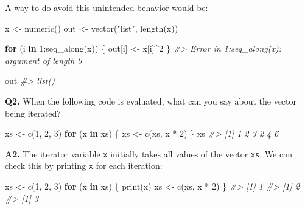 \documentclass[
]{book}
\newenvironment{Shaded}{\begin{snugshade}}{\end{snugshade}}
\newcommand{\CommentTok}[1]{\textcolor[rgb]{0.56,0.35,0.01}{\textit{#1}}}
\newcommand{\ControlFlowTok}[1]{\textcolor[rgb]{0.13,0.29,0.53}{\textbf{#1}}}
\newcommand{\DecValTok}[1]{\textcolor[rgb]{0.00,0.00,0.81}{#1}}
\newcommand{\FunctionTok}[1]{\textcolor[rgb]{0.00,0.00,0.00}{#1}}
\newcommand{\NormalTok}[1]{#1}
\newcommand{\OtherTok}[1]{\textcolor[rgb]{0.56,0.35,0.01}{#1}}
\newcommand{\SpecialCharTok}[1]{\textcolor[rgb]{0.00,0.00,0.00}{#1}}
\newcommand{\StringTok}[1]{\textcolor[rgb]{0.31,0.60,0.02}{#1}}
\begin{document}
A way to do avoid this unintended behavior would be:

\begin{Shaded}
\begin{Highlighting}[]
\NormalTok{x }\OtherTok{\textless{}{-}} \FunctionTok{numeric}\NormalTok{()}
\NormalTok{out }\OtherTok{\textless{}{-}} \FunctionTok{vector}\NormalTok{(}\StringTok{"list"}\NormalTok{, }\FunctionTok{length}\NormalTok{(x))}

\ControlFlowTok{for}\NormalTok{ (i }\ControlFlowTok{in} \DecValTok{1}\SpecialCharTok{:}\FunctionTok{seq\_along}\NormalTok{(x)) \{}
\NormalTok{  out[i] }\OtherTok{\textless{}{-}}\NormalTok{ x[i]}\SpecialCharTok{\^{}}\DecValTok{2}
\NormalTok{\}}
\CommentTok{\#\textgreater{} Error in 1:seq\_along(x): argument of length 0}

\NormalTok{out}
\CommentTok{\#\textgreater{} list()}
\end{Highlighting}
\end{Shaded}

\textbf{Q2.} When the following code is evaluated, what can you say about the vector being iterated?

\begin{Shaded}
\begin{Highlighting}[]
\NormalTok{xs }\OtherTok{\textless{}{-}} \FunctionTok{c}\NormalTok{(}\DecValTok{1}\NormalTok{, }\DecValTok{2}\NormalTok{, }\DecValTok{3}\NormalTok{)}
\ControlFlowTok{for}\NormalTok{ (x }\ControlFlowTok{in}\NormalTok{ xs) \{}
\NormalTok{  xs }\OtherTok{\textless{}{-}} \FunctionTok{c}\NormalTok{(xs, x }\SpecialCharTok{*} \DecValTok{2}\NormalTok{)}
\NormalTok{\}}
\NormalTok{xs}
\CommentTok{\#\textgreater{} [1] 1 2 3 2 4 6}
\end{Highlighting}
\end{Shaded}

\textbf{A2.} The iterator variable \texttt{x} initially takes all values of the vector \texttt{xs}. We can check this by printing \texttt{x} for each iteration:

\begin{Shaded}
\begin{Highlighting}[]
\NormalTok{xs }\OtherTok{\textless{}{-}} \FunctionTok{c}\NormalTok{(}\DecValTok{1}\NormalTok{, }\DecValTok{2}\NormalTok{, }\DecValTok{3}\NormalTok{)}
\ControlFlowTok{for}\NormalTok{ (x }\ControlFlowTok{in}\NormalTok{ xs) \{}
  \FunctionTok{print}\NormalTok{(x)}
\NormalTok{  xs }\OtherTok{\textless{}{-}} \FunctionTok{c}\NormalTok{(xs, x }\SpecialCharTok{*} \DecValTok{2}\NormalTok{)}
\NormalTok{\}}
\CommentTok{\#\textgreater{} [1] 1}
\CommentTok{\#\textgreater{} [1] 2}
\CommentTok{\#\textgreater{} [1] 3}
\end{Highlighting}
\end{Shaded}
\end{document}
